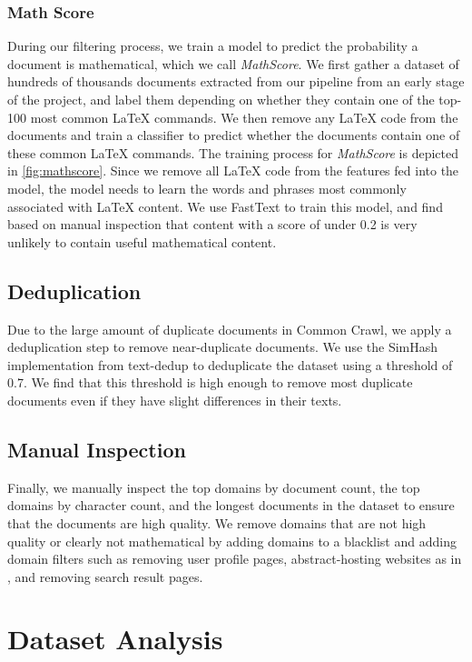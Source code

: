 \subsubsection{Math Score}
\label{sec:math_score}

During our filtering process, we train a model to predict the probability a document is mathematical, which we call \textit{MathScore}. We first gather a dataset of hundreds of thousands documents extracted from our pipeline from an early stage of the project, and label them depending on whether they contain one of the top-100 most common \LaTeX{} commands. We then remove any \LaTeX{} code from the documents and train a classifier to predict whether the documents contain one of these common \LaTeX{} commands. The training process for \textit{MathScore} is depicted in \autoref{fig:mathscore}. Since we remove all \LaTeX{} code from the features fed into the model, the model needs to learn the words and phrases most commonly associated with \LaTeX{} content. We use FastText \citep{joulin2016fasttext} to train this model, and find based on manual inspection that content with a score of under 0.2 is very unlikely to contain useful mathematical content.

\subsection{Deduplication}

Due to the large amount of duplicate documents in Common Crawl, we apply a deduplication step to remove near-duplicate documents. We use the SimHash implementation from text-dedup \citep{text-dedup} to deduplicate the dataset using a threshold of 0.7. We find that this threshold is high enough to remove most duplicate documents even if they have slight differences in their texts.

\subsection{Manual Inspection}

Finally, we manually inspect the top domains by document count, the top domains by character count, and the longest documents in the dataset to ensure that the documents are high quality. We remove domains that are not high quality or clearly not mathematical by adding domains to a blacklist and adding domain filters such as removing user profile pages, abstract-hosting websites as in \citet{lewkowycz2022solving}, and removing search result pages.\section{Dataset Analysis}

